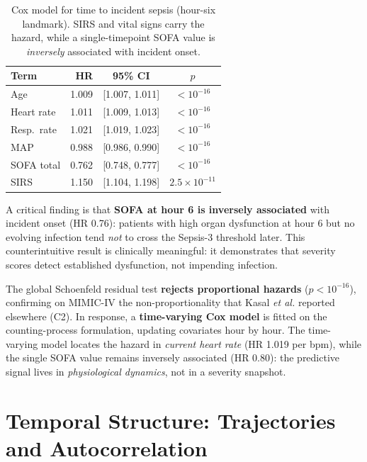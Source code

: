 \begin{table}[H]
    \centering
    \begin{tabular}{l|r|c|c}
        \hline
        \textbf{Term} & \textbf{HR} & \textbf{95\% CI} & \textbf{$p$} \\
        \hline\hline
        Age           & 1.009 & [1.007, 1.011] & $< 10^{-16}$ \\
        Heart rate    & 1.011 & [1.009, 1.013] & $< 10^{-16}$ \\
        Resp.\ rate   & 1.021 & [1.019, 1.023] & $< 10^{-16}$ \\
        MAP           & 0.988 & [0.986, 0.990] & $< 10^{-16}$ \\
        SOFA total    & 0.762 & [0.748, 0.777] & $< 10^{-16}$ \\
        SIRS          & 1.150 & [1.104, 1.198] & $2.5 \times 10^{-11}$ \\
        \hline
    \end{tabular}
    \caption{Cox model for time to incident sepsis (hour-six landmark). SIRS
    and vital signs carry the hazard, while a single-timepoint SOFA value is
    \emph{inversely} associated with incident onset.}
    \label{table:cox_baseline}
\end{table}

A critical finding is that \textbf{SOFA at hour 6 is inversely associated}
with incident onset (HR 0.76): patients with high organ dysfunction at hour 6
but no evolving infection tend \emph{not} to cross the Sepsis-3 threshold
later. This counterintuitive result is clinically meaningful: it demonstrates
that severity scores detect established dysfunction, not impending infection.

The global Schoenfeld residual test \textbf{rejects proportional hazards}
($p < 10^{-16}$), confirming on MIMIC-IV the non-proportionality that Kasal
\emph{et al.} \cite{kasal2004cox} reported elsewhere (C2). In response, a
\textbf{time-varying Cox model} is fitted on the counting-process formulation,
updating covariates hour by hour. The time-varying model locates the hazard
in \emph{current heart rate} (HR 1.019 per bpm), while the single SOFA value
remains inversely associated (HR 0.80): the predictive signal lives in
\emph{physiological dynamics}, not in a severity snapshot.

\section{Temporal Structure: Trajectories and Autocorrelation}

